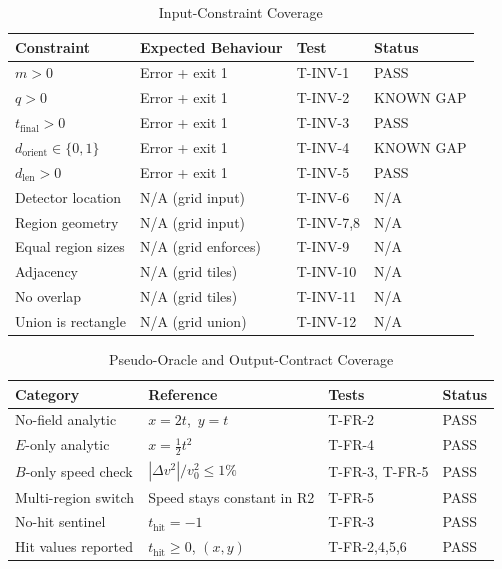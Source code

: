 \documentclass[12pt, titlepage]{article}
\begin{document}
\begin{table}[h]
\caption{Input-Constraint Coverage}
\label{tab:cov-constraint}
\centering
\begin{tabular}{llll}
\toprule
\textbf{Constraint} & \textbf{Expected Behaviour} & \textbf{Test} & \textbf{Status} \\
\midrule
$m>0$                      & Error + exit 1       & T-INV-1  & PASS \\
$q>0$                      & Error + exit 1       & T-INV-2  & KNOWN GAP \\
$t_\text{final}>0$         & Error + exit 1       & T-INV-3  & PASS \\
$d_\text{orient}\in\{0,1\}$& Error + exit 1       & T-INV-4  & KNOWN GAP \\
$d_\text{len}>0$           & Error + exit 1       & T-INV-5  & PASS \\
Detector location          & N/A (grid input)     & T-INV-6  & N/A \\
Region geometry            & N/A (grid input)     & T-INV-7,8& N/A \\
Equal region sizes         & N/A (grid enforces)  & T-INV-9  & N/A \\
Adjacency                  & N/A (grid tiles)     & T-INV-10 & N/A \\
No overlap                 & N/A (grid tiles)     & T-INV-11 & N/A \\
Union is rectangle         & N/A (grid union)     & T-INV-12 & N/A \\
\bottomrule
\end{tabular}
\end{table}

\begin{table}[h]
\caption{Pseudo-Oracle and Output-Contract Coverage}
\label{tab:cov-oracle}
\centering
\begin{tabular}{llll}
\toprule
\textbf{Category} & \textbf{Reference} & \textbf{Tests} & \textbf{Status} \\
\midrule
No-field analytic     & $x=2t$,\ $y=t$             & T-FR-2          & PASS \\
$E$-only analytic     & $x=\tfrac{1}{2}t^2$         & T-FR-4          & PASS \\
$B$-only speed check  & $|\Delta v^2|/v_0^2\le1\%$  & T-FR-3, T-FR-5  & PASS \\
Multi-region switch   & Speed stays constant in R2  & T-FR-5          & PASS \\
No-hit sentinel       & $t_\text{hit}=-1$           & T-FR-3          & PASS \\
Hit values reported   & $t_\text{hit}\ge0$, $(x,y)$ & T-FR-2,4,5,6    & PASS \\
\bottomrule
\end{tabular}
\end{table}
\end{document}
